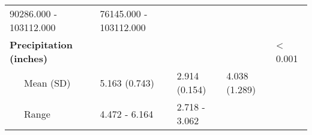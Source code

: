 \begin{longtable}[c]{@{}lllll@{}}
\begin{minipage}[t]{0.15\columnwidth}
90286.000 - 103112.000
\end{minipage} & \begin{minipage}[t]{0.15\columnwidth}\raggedright
76145.000 - 103112.000
\end{minipage} & \begin{minipage}[t]{0.52\columnwidth}\raggedright
\end{minipage}
\\\addlinespace
\begin{minipage}[t]{0.33\columnwidth}\raggedright
\textbf{Precipitation (inches)}
\end{minipage} & \begin{minipage}[t]{0.15\columnwidth}\raggedright
\end{minipage} & \begin{minipage}[t]{0.15\columnwidth}\raggedright
\end{minipage} & \begin{minipage}[t]{0.15\columnwidth}\raggedright
\end{minipage} & \begin{minipage}[t]{0.52\columnwidth}\raggedright
\textless{} 0.001
\end{minipage}
\\\addlinespace
\begin{minipage}[t]{0.33\columnwidth}\raggedright
~~~Mean (SD)
\end{minipage} & \begin{minipage}[t]{0.15\columnwidth}\raggedright
5.163 (0.743)
\end{minipage} & \begin{minipage}[t]{0.15\columnwidth}\raggedright
2.914 (0.154)
\end{minipage} & \begin{minipage}[t]{0.15\columnwidth}\raggedright
4.038 (1.289)
\end{minipage} & \begin{minipage}[t]{0.52\columnwidth}\raggedright
\end{minipage}
\\\addlinespace
\begin{minipage}[t]{0.33\columnwidth}\raggedright
~~~Range
\end{minipage} & \begin{minipage}[t]{0.15\columnwidth}\raggedright
4.472 - 6.164
\end{minipage} & \begin{minipage}[t]{0.15\columnwidth}\raggedright
2.718 - 3.062
\end{minipage} & \begin{minipage}[t]{0.15\columnwidth}\raggedright

\end{minipage}
\end{longtable}
